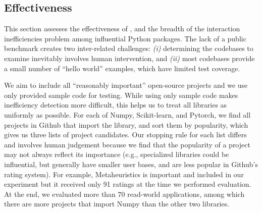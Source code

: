





\subsection{Effectiveness}

This section assesses the effectiveness of \tool{}, and the breadth of the interaction inefficiencies problem among influential Python packages. The lack of a public benchmark creates two inter-related challenges: \emph{(i)} determining the codebases to examine inevitably involves human intervention, and \emph{(ii)} most codebases provide a small number of ``hello world'' examples, which have limited test coverage. 

We aim to include all ``reasonably important'' open-source projects and we use only provided sample code for testing. While using only sample code makes inefficiency detection more difficult, this helps us to treat all libraries as uniformly as possible. For each of Numpy, Scikit-learn, and Pytorch, we find all projects in Github that import the library, and sort them by popularity, which gives us three lists of project candidates. Our stopping rule for each list differs and involves human judgement because we find that the popularity of a project may not always reflect its importance (e.g., specialized libraries could be influential, but generally have smaller user bases, and are less popular in Github's rating system). For example, Metaheuristics is important and included in our experiment but it received only 91 ratings at the time we performed evaluation. At the end, we evaluated more than 70 read-world applications, among which there are more projects that import Numpy than the other two libraries. 


